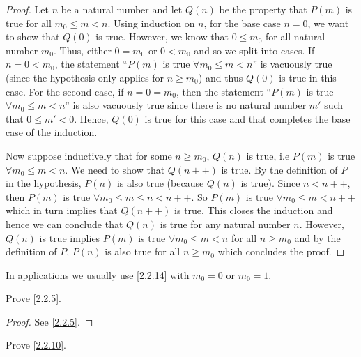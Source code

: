 \begin{proof}
  Let \(n\) be a natural number and let \(Q(n)\) be the property that \(P(m)\) is true for all \(m_0 \leq m < n\).
  Using induction on \(n\), for the base case \(n = 0\), we want to show that \(Q(0)\) is true.
  However, we know that \(0 \leq m_0\) for all natural number \(m_0\).
  Thus, either \(0 = m_0\) or \(0 < m_0\) and so we split into cases.
  If \(n = 0 < m_0\), the statement ``\(P(m)\) is true \(\forall m_0 \leq m < n\)'' is vacuously true (since the hypothesis only applies for \(n \geq m_0\)) and thus \(Q(0)\) is true in this case.
  For the second case, if \(n = 0 = m_0\), then the statement ``\(P(m)\) is true \(\forall m_0 \leq m < n\)'' is also vacuously true since there is no natural number \(m'\) such that \(0 \leq m' < 0\). Hence, \(Q(0)\) is true for this case and that completes the base case of the induction.

  Now suppose inductively that for some \(n \geq m_0\), \(Q(n)\) is true, i.e \(P(m)\) is true \(\forall m_0 \leq m < n\).
  We need to show that \(Q(n++)\) is true.
  By the definition of \(P\) in the hypothesis, \(P(n)\) is also true (because \(Q(n)\) is true).
  Since \(n < n++\), then \(P(m)\) is true \(\forall m_0 \leq m \leq n < n++\).
  So \(P(m)\) is true \(\forall m_0 \leq m < n++\) which in turn implies that \(Q(n++)\) is true.
  This closes the induction and hence we can conclude that \(Q(n)\) is true for any natural number \(n\).
  However, \(Q(n)\) is true implies \(P(m)\) is true \(\forall m_0 \leq m < n\) for all \(n \geq m_0\) and by the definition of \(P\), \(P(n)\) is also true for all \(n \geq m_0\) which concludes the proof.
\end{proof}

\begin{rmk}\label{2.2.15}
  In applications we usually use \cref{2.2.14} with \(m_0 = 0\) or \(m_0 = 1\).
\end{rmk}

\exercisesection

\begin{ex}\label{ex:2.2.1}
  Prove \cref{2.2.5}.
\end{ex}

\begin{proof}
  See \cref{2.2.5}.
\end{proof}

\begin{ex}\label{ex:2.2.2}
  Prove \cref{2.2.10}.
\end{ex}

